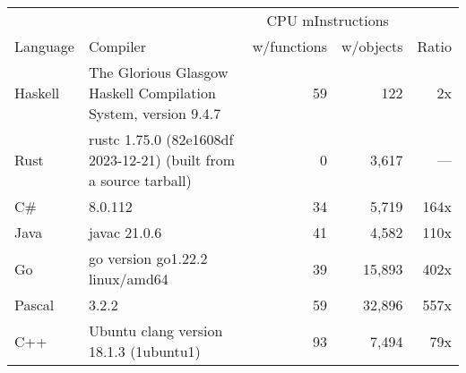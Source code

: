 \documentclass{article}
\begin{document}
      \begin{tabularx}{\linewidth}{lXrrr}
      \toprule
        & & \multicolumn{2}{c}{CPU mInstructions} & \\
        Language & Compiler & w/functions & w/objects & Ratio \\
      \midrule
    Haskell & The Glorious Glasgow Haskell Compilation System, version 9.4.7 & 59 & 122 & 2x \\
Rust & rustc 1.75.0 (82e1608df 2023-12-21) (built from a source tarball) & 0 & 3,617 & --- \\
C\# & 8.0.112 & 34 & 5,719 & 164x \\
Java & javac 21.0.6 & 41 & 4,582 & 110x \\
Go & go version go1.22.2 linux/amd64 & 39 & 15,893 & 402x \\
Pascal & 3.2.2 & 59 & 32,896 & 557x \\
C++ & Ubuntu clang version 18.1.3 (1ubuntu1) & 93 & 7,494 & 79x \\

      \bottomrule
      \end{tabularx}
      
\end{document}

